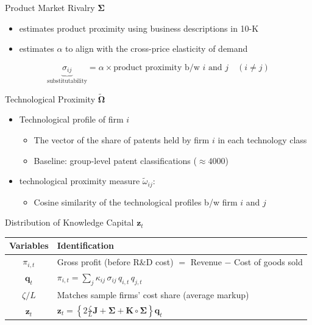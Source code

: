 \documentclass[
  10pt,
  aspectratio=169,   %
  handout           %
]{beamer}
\theoremstyle{plain}
\begin{document}
\begin{frame}{Product Market Rivalry $\bm{\Sigma}$}
  \label{product_identification}
  \begin{itemize}
    \item \citet{Hoberg2016-jm} estimates product proximity using business descriptions in 10-K
    \medskip{}
    \item \citet{Pellegrino2024-dn} estimates $\alpha$ to align with the cross-price elasticity of demand \hyperlink{micro_vs_ghl}{}
  \end{itemize}
  \medskip{}
  \[
    \underbrace{\sigma_{ij}}_{\text{substitutability}}=\alpha\times\text{product proximity b/w }i\text{ and }j\quad\left(i\neq j\right)
  \]
\end{frame}

\begin{frame}{Technological Proximity $\widetilde{\bm{\Omega}}$}
  \begin{itemize}
    \item Technological profile of firm $i$
    \begin{itemize}
      \item The vector of the share of patents held by firm $i$ in each technology class
      \item Baseline: group-level patent classifications ($\approx4000$)
      \medskip{}
    \end{itemize}
    \medskip{}
    \item \citet{Jaffe1986-yz} technological proximity measure $\tilde{\omega}_{ij}$:
    \begin{itemize}
      \item Cosine similarity of the technological profiles b/w firm $i$ and $j$
    \end{itemize}
  \end{itemize}
\end{frame}

\begin{frame}{Distribution of Knowledge Capital $\bm{z}_t$}
  \begin{table}[htbp]
    \centering
    \begin{tabular}{cl}
      \toprule
      Variables & Identification \\
      \midrule
      $\pi_{i,t}$
      & Gross profit (before R\&D cost)
      $=$ Revenue $-$ Cost of goods sold \\[6pt]
      $\bm{q}_t$
      &
      $\pi_{i,t}=\displaystyle\sum_{j}\kappa_{ij}\,\sigma_{ij}\,q_{i,t}\,q_{j,t}$ \\[6pt]
      $\zeta/L$
      & Matches sample firms' cost share (average markup) \\[6pt]
      $\bm{z}_t$
      &
      $\displaystyle \bm{z}_{t}
      =\left\{2\frac{\zeta}{L}\bm{J}+\bm{\Sigma}+\bm{K}\circ\bm{\Sigma}\right\}\bm{q}_{t}$ \\
      \bottomrule
    \end{tabular}
  \end{table}
\end{frame}
\end{document}
